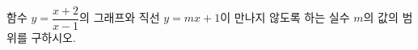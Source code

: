 \hspace*{2mm}\begin{minipage}[t]{\dimexpr\linewidth-2mm\relax}\vspace{0pt}
함수 $y=\dfrac{x+2}{x-1}$의 그래프와 직선 $y=mx+1$이 만나지 않도록 하는 실수 $m$의 값의 범위를 구하시오.\end{minipage}
